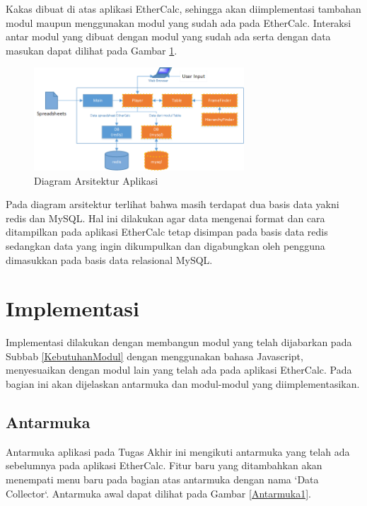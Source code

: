 Kakas dibuat di atas aplikasi EtherCalc, sehingga akan diimplementasi tambahan modul maupun menggunakan modul yang sudah ada pada EtherCalc. Interaksi antar modul yang dibuat dengan modul yang sudah ada serta dengan data masukan dapat dilihat pada Gambar \ref{ArchDiagram}.

\begin{figure}[htb]
	\centering
	\includegraphics[width=0.7\textwidth]{resources/chapter-4-architecture.png}
	\caption{Diagram Arsitektur Aplikasi}
	\label{ArchDiagram}
\end{figure}

Pada diagram arsitektur terlihat bahwa masih terdapat dua basis data yakni redis dan MySQL. Hal ini dilakukan agar data mengenai format dan cara ditampilkan pada aplikasi EtherCalc tetap disimpan pada basis data redis sedangkan data yang ingin dikumpulkan dan digabungkan oleh pengguna dimasukkan pada basis data relasional MySQL.


\section{Implementasi}
Implementasi dilakukan dengan membangun modul yang telah dijabarkan pada Subbab \ref{KebutuhanModul} dengan menggunakan bahasa Javascript, menyesuaikan dengan modul lain yang telah ada pada aplikasi EtherCalc. Pada bagian ini akan dijelaskan antarmuka dan modul-modul yang diimplementasikan.
\subsection{Antarmuka}
Antarmuka aplikasi pada Tugas Akhir ini mengikuti antarmuka yang telah ada sebelumnya pada aplikasi EtherCalc. Fitur baru yang ditambahkan akan menempati menu baru pada bagian atas antarmuka dengan nama `Data Collector`. Antarmuka awal dapat dilihat pada Gambar \ref{Antarmuka1}.


